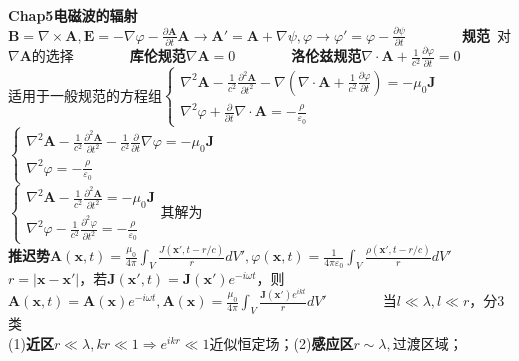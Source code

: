\documentclass[10pt,a4paper]{article}
\begin{document}
\begin{multicols}{2}
\noindent\textbf{Chap5电磁波的辐射}\\
\scriptsize$\bm{B}=\nabla\times\bm{A},\bm{E}=-\nabla\varphi-\frac{\partial\bm{A}}{\partial t}$\scriptsize$\bm{A}\to\bm{A}'=\bm{A}+\nabla\psi,\varphi\to\varphi'=\varphi-\frac{\partial\psi}{\partial t}$\scriptsize~~~~~~~~\textbf{规范}~对$\nabla\bm{A}$的选择~~~~~~~~\textbf{库伦规范}$\nabla\bm{A}=0$~~~~~~~~\textbf{洛伦兹规范}$\nabla\cdot\bm{A}+\frac{1}{c^2}\frac{\partial\varphi}{\partial t}=0$\\
适用于一般规范的方程组$\left\{\begin{array}{l}\nabla^2\bm{A}-\frac{1}{c^2}\frac{\partial^2\bm{A}}{\partial t^2}-\nabla(\nabla\cdot\bm{A}+\frac{1}{c^2}\frac{\partial\varphi}{\partial t})=-\mu_0\bm{J}\\\nabla^2\varphi+\frac{\partial}{\partial t}\nabla\cdot\bm{A}=-\frac{\rho}{\varepsilon_0}\end{array}\right.$\\
$\left\{\begin{array}{l}\nabla^2\bm{A}-\frac{1}{c^2}\frac{\partial^2\bm{A}}{\partial t^2}-\frac{1}{c^2}\frac{\partial}{\partial t}\nabla\varphi=-\mu_0\bm{J}\\\nabla^2\varphi=-\frac{\rho}{\varepsilon_0}\end{array}\right.$\\
$\left\{\begin{array}{l}\nabla^2\bm{A}-\frac{1}{c^2}\frac{\partial^2\bm{A}}{\partial t^2}=-\mu_0\bm{J}\\\nabla^2\varphi-\frac{1}{c^2}\frac{\partial^2\varphi}{\partial t^2}=-\frac{\rho}{\varepsilon_0}\end{array}\right.$其解为\\
\textbf{推迟势}$\bm{A}(\bm{x},t)=\frac{\mu_0}{4\pi}\int_V\frac{J(\bm{x}',t-r/c)}{r}dV',\varphi(\bm{x},t)=\frac{1}{4\pi\varepsilon_0}\int_V\frac{\rho(\bm{x}',t-r/c)}{r}dV'$\\
$r=|\bm{x}-\bm{x}'|$，若$\bm{J}(\bm{x'},t)=\bm{J}(\bm{x}')e^{-i\omega t}$，则\\
\indent$\bm{A}(\bm{x},t)=\bm{A}(\bm{x})e^{-i\omega t},\bm{A}(\bm{x})=\frac{\mu_0}{4\pi}\int_V\frac{\bm{J}(\bm{x}')e^{ikt}}{r}dV'$~~~~~~~~当$l\ll\lambda,l\ll r$，分3类\\
\indent(1)\textbf{近区}$r\ll\lambda,kr\ll1\Rightarrow e^{ikr}\ll1$近似恒定场；(2)\textbf{感应区}$r\sim\lambda,$过渡区域；\\

\end{multicols}
\end{document}
